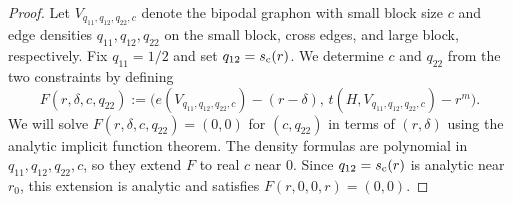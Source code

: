 \begin{proof}
Let $V_{q_{11},q_{12},q_{22},c}$ denote the bipodal graphon with small block size
$c$ and edge densities $q_{11},q_{12},q_{22}$ on the small block, cross edges,
and large block, respectively.  Fix $q_{11}=1/2$ and set $q_{12}=\sc(r)$.
We determine $c$ and $q_{22}$ from the two constraints by defining
\[
  F(r,\delta,c,q_{22})
  :=\bigl(e(V_{q_{11},q_{12},q_{22},c})-(r-\delta),\,
  t(H,V_{q_{11},q_{12},q_{22},c})-r^m\bigr).
\]
We will solve $F(r,\delta,c,q_{22})=(0,0)$ for $(c,q_{22})$ in terms of $(r,\delta)$
using the analytic implicit function theorem.
The density formulas are polynomial in $q_{11},q_{12},q_{22},c$, so they
extend $F$ to real $c$ near $0$.  Since $q_{12}=\sc(r)$ is analytic near
$r_0$, this extension is analytic and satisfies $F(r,0,0,r)=(0,0)$.


\end{proof}
